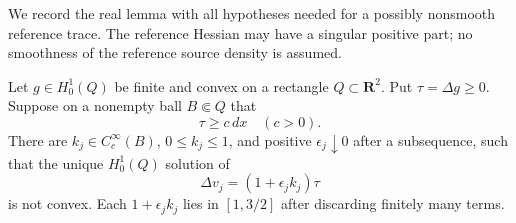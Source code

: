 We record the real lemma with all hypotheses needed for a possibly
nonsmooth reference trace. The reference Hessian may have a singular
positive part; no smoothness of the reference source density is assumed.

\begin{lemma}
Let $g\in H_0^1(Q)$ be finite and convex on a rectangle $Q\subset
\mathbf R^2$. Put $\tau=\Delta g\ge0$. Suppose on a nonempty ball
$B\Subset Q$ that
\[
                         \tau\ge c\,dx\quad(c>0).
 \tag{FP8}
\]
There are $k_j\in C_c^\infty(B)$, $0\le k_j\le1$, and positive
$\epsilon_j\downarrow0$ after a subsequence, such that the unique
$H_0^1(Q)$ solution of
\[
                 \Delta v_j=(1+\epsilon_j k_j)\tau
 \tag{FP9}
\]
is not convex. Each $1+\epsilon_jk_j$ lies in $[1,3/2]$ after
discarding finitely many terms.
\end{lemma}

